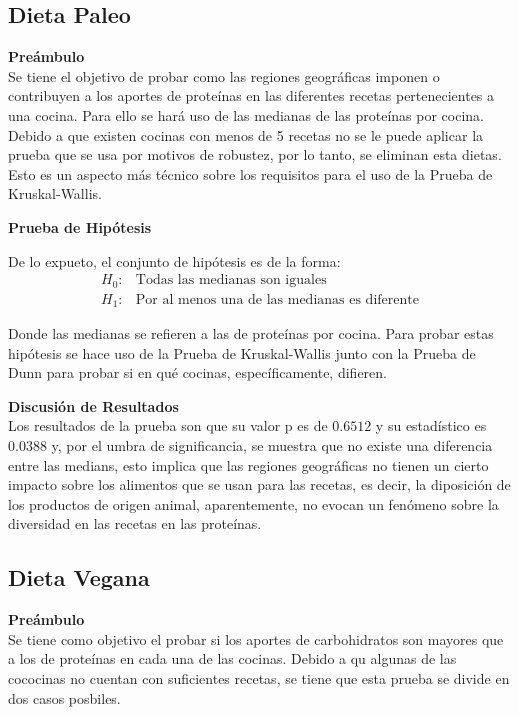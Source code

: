 \documentclass[12pt,a4paper]{article}
\begin{document}
    \subsection{Dieta Paleo}
        \textbf{Preámbulo}\\
        {
            Se tiene el objetivo de probar como las regiones geográficas imponen o contribuyen 
            a los aportes de proteínas en las diferentes recetas pertenecientes a una cocina. Para 
            ello se hará uso de las medianas de las proteínas por cocina.\\

            Debido a que existen cocinas con menos de 5 recetas no se le puede aplicar la 
            prueba que se usa por motivos de robustez, por lo tanto, se eliminan esta dietas. Esto 
            es un aspecto más técnico sobre los requisitos para el uso de la Prueba de Kruskal-Wallis.\\
        }

        \textbf{Prueba de Hipótesis}\\
        {
            De lo expueto, el conjunto de hipótesis es de la forma:
            \begin{align*}
                H_0 :& \text{Todas las medianas son iguales} \\
                H_1 :& \text{Por al menos una de las medianas es diferente}
            \end{align*}

            Donde las medianas se refieren a las de proteínas por cocina. Para probar 
            estas hipótesis se hace uso de la Prueba de Kruskal-Wallis junto con la 
            Prueba de Dunn para probar si en qué cocinas, específicamente, difieren.\\
        }

        \textbf{Discusión de Resultados}\\
        {
            Los resultados de la prueba son que su valor p es de $0.6512$ y su estadístico es 
            $0.0388$ y, por el umbra de significancia, se muestra que no existe una diferencia entre 
            las medians, esto implica que las regiones geográficas no tienen un cierto impacto sobre 
            los alimentos que se usan para las recetas, es decir, la diposición de los productos de 
            origen animal, aparentemente, no evocan un fenómeno sobre la diversidad en las recetas 
            en las proteínas.
        }

    \subsection{Dieta Vegana}
        \textbf{Preámbulo}\\
        {
            Se tiene como objetivo el probar si los aportes de carbohidratos son mayores 
            que a los de proteínas en cada una de las cocinas. Debido a qu algunas de las 
            cococinas no cuentan con suficientes recetas, se tiene que esta prueba se divide 
            en dos casos posbiles.
        }
\end{document}
